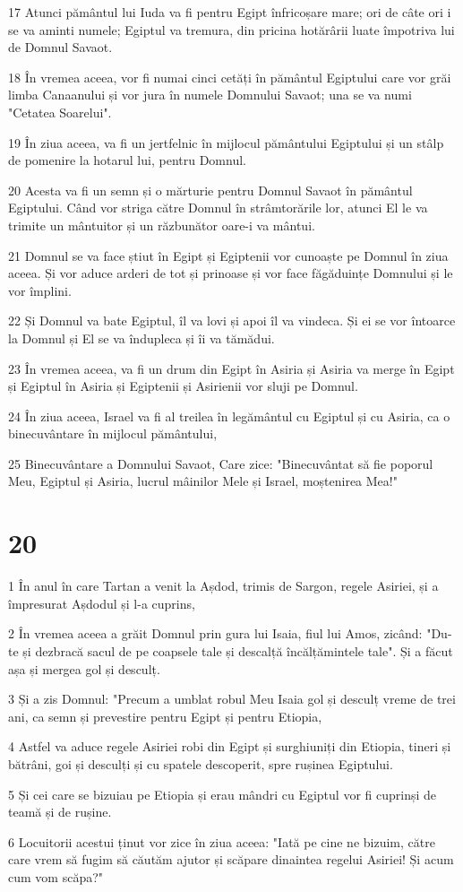 \par 17 Atunci pământul lui Iuda va fi pentru Egipt înfricoșare mare; ori de câte ori i se va aminti numele; Egiptul va tremura, din pricina hotărârii luate împotriva lui de Domnul Savaot.
\par 18 În vremea aceea, vor fi numai cinci cetăți în pământul Egiptului care vor grăi limba Canaanului și vor jura în numele Domnului Savaot; una se va numi "Cetatea Soarelui".
\par 19 În ziua aceea, va fi un jertfelnic în mijlocul pământului Egiptului și un stâlp de pomenire la hotarul lui, pentru Domnul.
\par 20 Acesta va fi un semn și o mărturie pentru Domnul Savaot în pământul Egiptului. Când vor striga către Domnul în strâmtorările lor, atunci El le va trimite un mântuitor și un răzbunător oare-i va mântui.
\par 21 Domnul se va face știut în Egipt și Egiptenii vor cunoaște pe Domnul în ziua aceea. Și vor aduce arderi de tot și prinoase și vor face făgăduințe Domnului și le vor împlini.
\par 22 Și Domnul va bate Egiptul, îl va lovi și apoi îl va vindeca. Și ei se vor întoarce la Domnul și El se va îndupleca și îi va tămădui.
\par 23 În vremea aceea, va fi un drum din Egipt în Asiria și Asiria va merge în Egipt și Egiptul în Asiria și Egiptenii și Asirienii vor sluji pe Domnul.
\par 24 În ziua aceea, Israel va fi al treilea în legământul cu Egiptul și cu Asiria, ca o binecuvântare în mijlocul pământului,
\par 25 Binecuvântare a Domnului Savaot, Care zice: "Binecuvântat să fie poporul Meu, Egiptul și Asiria, lucrul mâinilor Mele și Israel, moștenirea Mea!"

\chapter{20}

\par 1 În anul în care Tartan a venit la Așdod, trimis de Sargon, regele Asiriei, și a împresurat Așdodul și l-a cuprins,
\par 2 În vremea aceea a grăit Domnul prin gura lui Isaia, fiul lui Amos, zicând: "Du-te și dezbracă sacul de pe coapsele tale și descalță încălțămintele tale". Și a făcut așa și mergea gol și desculț.
\par 3 Și a zis Domnul: "Precum a umblat robul Meu Isaia gol și desculț vreme de trei ani, ca semn și prevestire pentru Egipt și pentru Etiopia,
\par 4 Astfel va aduce regele Asiriei robi din Egipt și surghiuniți din Etiopia, tineri și bătrâni, goi și desculți și cu spatele descoperit, spre rușinea Egiptului.
\par 5 Și cei care se bizuiau pe Etiopia și erau mândri cu Egiptul vor fi cuprinși de teamă și de rușine.
\par 6 Locuitorii acestui ținut vor zice în ziua aceea: "Iată pe cine ne bizuim, către care vrem să fugim să căutăm ajutor și scăpare dinaintea regelui Asiriei! Și acum cum vom scăpa?"

